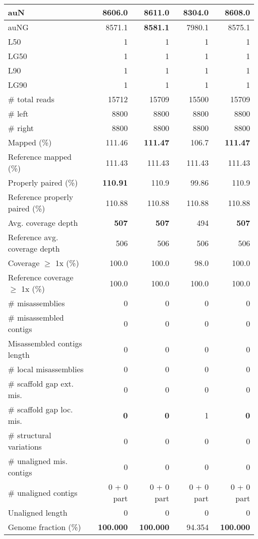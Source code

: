 \documentclass[12pt,a4paper]{article}
\begin{document}
\begin{table}[ht]
\begin{center}
\begin{tabular}{|l*{4}{|r}|}
auN & 8606.0 & {\bf 8611.0} & 8304.0 & 8608.0 \\ \hline
auNG & 8571.1 & {\bf 8581.1} & 7980.1 & 8575.1 \\ \hline
L50 & 1 & 1 & 1 & 1 \\ \hline
LG50 & 1 & 1 & 1 & 1 \\ \hline
L90 & 1 & 1 & 1 & 1 \\ \hline
LG90 & 1 & 1 & 1 & 1 \\ \hline
\# total reads & 15712 & 15709 & 15500 & 15709 \\ \hline
\# left & 8800 & 8800 & 8800 & 8800 \\ \hline
\# right & 8800 & 8800 & 8800 & 8800 \\ \hline
Mapped (\%) & 111.46 & {\bf 111.47} & 106.7 & {\bf 111.47} \\ \hline
Reference mapped (\%) & 111.43 & 111.43 & 111.43 & 111.43 \\ \hline
Properly paired (\%) & {\bf 110.91} & 110.9 & 99.86 & 110.9 \\ \hline
Reference properly paired (\%) & 110.88 & 110.88 & 110.88 & 110.88 \\ \hline
Avg. coverage depth & {\bf 507} & {\bf 507} & 494 & {\bf 507} \\ \hline
Reference avg. coverage depth & 506 & 506 & 506 & 506 \\ \hline
Coverage $\geq$ 1x (\%) & 100.0 & 100.0 & 98.0 & 100.0 \\ \hline
Reference coverage $\geq$ 1x (\%) & 100.0 & 100.0 & 100.0 & 100.0 \\ \hline
\# misassemblies & 0 & 0 & 0 & 0 \\ \hline
\# misassembled contigs & 0 & 0 & 0 & 0 \\ \hline
Misassembled contigs length & 0 & 0 & 0 & 0 \\ \hline
\# local misassemblies & 0 & 0 & 0 & 0 \\ \hline
\# scaffold gap ext. mis. & 0 & 0 & 0 & 0 \\ \hline
\# scaffold gap loc. mis. & {\bf 0} & {\bf 0} & 1 & {\bf 0} \\ \hline
\# structural variations & 0 & 0 & 0 & 0 \\ \hline
\# unaligned mis. contigs & 0 & 0 & 0 & 0 \\ \hline
\# unaligned contigs & 0 + 0 part & 0 + 0 part & 0 + 0 part & 0 + 0 part \\ \hline
Unaligned length & 0 & 0 & 0 & 0 \\ \hline
Genome fraction (\%) & {\bf 100.000} & {\bf 100.000} & 94.354 & {\bf 100.000} \\ \hline

\end{tabular}
\end{center}
\end{table}
\end{document}
